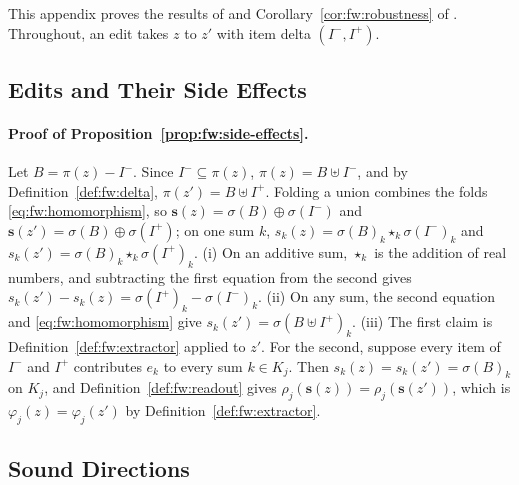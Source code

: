 
This appendix proves the results of  and Corollary~\ref{cor:fw:robustness} of . Throughout, an edit takes $z$ to $z'$ with item delta
$(I^-, I^+)$.

\subsection{Edits and Their Side Effects}
\label{sec:fw:proofs:side-effects}

\paragraph{Proof of Proposition~\ref{prop:fw:side-effects}.}
Let $B = \pi(z) - I^-$. Since $I^- \subseteq \pi(z)$, $\pi(z) = B \uplus I^-$, and by Definition~\ref{def:fw:delta},
$\pi(z') = B \uplus I^+$. Folding a union combines the folds \eqref{eq:fw:homomorphism}, so
$\mathbf{s}(z) = \sigma(B) \oplus \sigma(I^-)$ and $\mathbf{s}(z') = \sigma(B) \oplus \sigma(I^+)$; on one sum $k$,
$s_k(z) = \sigma(B)_k \star_k \sigma(I^-)_k$ and $s_k(z') = \sigma(B)_k \star_k \sigma(I^+)_k$. (i) On an additive
sum, $\star_k$ is the addition of real numbers, and subtracting the first equation from the second gives
$s_k(z') - s_k(z) = \sigma(I^+)_k - \sigma(I^-)_k$. (ii) On any sum, the second equation and
\eqref{eq:fw:homomorphism} give $s_k(z') = \sigma(B \uplus I^+)_k$. (iii) The first claim is
Definition~\ref{def:fw:extractor} applied to $z'$. For the second, suppose every item of $I^-$ and $I^+$ contributes
$e_k$ to every sum $k \in K_j$. Then $s_k(z) = s_k(z') = \sigma(B)_k$ on $K_j$, and Definition~\ref{def:fw:readout}
gives $\rho_j(\mathbf{s}(z)) = \rho_j(\mathbf{s}(z'))$, which is $\varphi_j(z) = \varphi_j(z')$ by
Definition~\ref{def:fw:extractor}.

\subsection{Sound Directions}
\label{sec:fw:proofs:directions}


